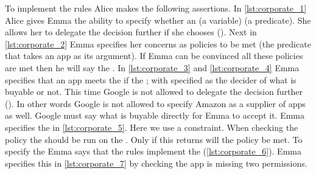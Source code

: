 \documentclass{scrartcl}
\begin{document}
To implement the rules Alice makes the following assertions.
In \autoref{lst:corporate_1} Alice gives Emma the ability to specify whether an  (a variable)  (a predicate).
She allows her to delegate the decision further if she chooses ().
Next in \autoref{lst:corporate_2} Emma specifies her concerns as policies to be met (the  predicate that takes an app as its argument).
If Emma can be convinced all these policies are met then he will say the .
In \autoref{lst:corporate_3} and \autoref{lst:corporate_4} Emma specifies that an app meets the  if the ;
  with  specified as the decider of what is buyable or not.
This time Google is not allowed to delegate the decision further ().
In other words Google is not allowed to specify Amazon as a supplier of apps as well.
Google must say what is buyable directly for Emma to accept it.
Emma specifies the  in \autoref{lst:corporate_5}.
Here we use a constraint.
When checking the policy the  should be run on the .
Only if this returns  will the policy be met.
To specify the  Emma says that the  rules implement the  (\autoref{lst:corporate_6}).
Emma specifies this in \autoref{lst:corporate_7} by checking the app is missing two permissions.
\end{document}
